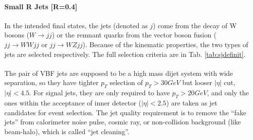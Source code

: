 \noindent
\\{\bf Small R Jets [R=0.4]}
\\
\\In the intended final states, the jets (denoted as $j$) come from the decay of W bosons ($W\to jj$) or the remnant quarks from the vector boson fusion ($jj\to WWjj$ or $jj \to WZjj$). Because of the kinematic properties, the two types of jets are selected respectively. The full selection criteria are in Tab. \ref{tab:sjdefinit}.
\\
\\The pair of VBF jets are supposed to be a high mass dijet system with wide separation, so they have tighter $p_{T}$ selection of $p_{T}>30GeV$ but looser $|\eta|$ cut, $|\eta|<4.5$. For signal jets, they are only required to have $p_{T}>20GeV$, and only the ones within the acceptance of inner detector ($|\eta|<2.5$) are taken as jet candidates for event selection. The jet quality requirement is to remove the ``fake jets'' from calorimeter noise pulse, cosmic ray, or non-collision background (like beam-halo), which is called ``jet cleaning''.

